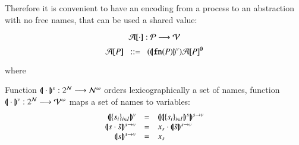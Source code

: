 Therefore it is convenient to have an encoding from a process to an abstraction
with no free names, that can be used a shared value:

\[
	\mathcal{A}[\!\![\cdot]\!\!] : \mathcal{P} \longrightarrow \mathcal{V}
\]
\[
	\amap{P} \bnfis \abs{\vmap{\fn{P}}}{\absmap{P}{\es}}
\]

where

Function $(\!|\!|\cdot|\!|\!)^s: 2^{\mathcal{N}} \longrightarrow \mathcal{N}^\omega$
orders lexicographically a set of names, function 
$(\!|\!|\cdot|\!|\!)^v: 2^{\mathcal{N}} \longrightarrow \mathcal{V}^\omega$
maps a set of names to variables:
\[
	\begin{array}{rcl}
		\vmap{\set{s_i}_{i \in I}} &=& \svmap{\smap{\set{s_i}_{i \in I}}}\\
		\svmap{s \cat \tilde{s}} &=& x_s \cat \svmap{\tilde{s}}\\
		\svmap{s} & = & x_s
	\end{array}
\]

